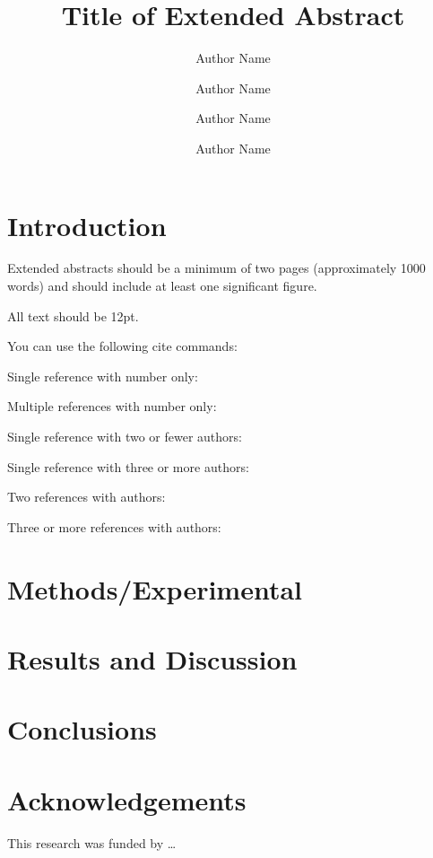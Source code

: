 \documentclass[12pt]{wssci}
\title{ Title of Extended Abstract }
\author[1]{Author Name}
\author[1]{Author Name}
\author[2]{Author Name}
\author[2,*]{Author Name}
\affil[1]{Department, Institution, Address, Country}
\affil[2]{Department, Institution, Address, Country}
\affil[*]{Corresponding author: \email{author@university.edu}}
\begin{document}
\maketitle

\section{Introduction}
%
Extended abstracts should be a minimum of two pages (approximately 1000 words) and should include at least one significant figure.

All text should be 12pt.


You can use the following cite commands:

Single reference with number only: \cite{Zhao2013}

Multiple references with number only: \cite{Affleck1967,Turanyi2014,uconnrcmpy}

Single reference with two or fewer authors: \textcite{Affleck1967}

Single reference with three or more authors: \textcite{Wang2011}

Two references with authors: \textcite{Kee1996,Baumgardner2013}

Three or more references with authors: \textcite{Kee1996,Baumgardner2013,Haworth2011}


\section{Methods/Experimental}
%
\blindtext


\section{Results and Discussion}
%
\blindtext

\section{Conclusions}
%
\blindtext

\section{Acknowledgements}
This research was funded by \ldots

\printbibliography
\end{document}
